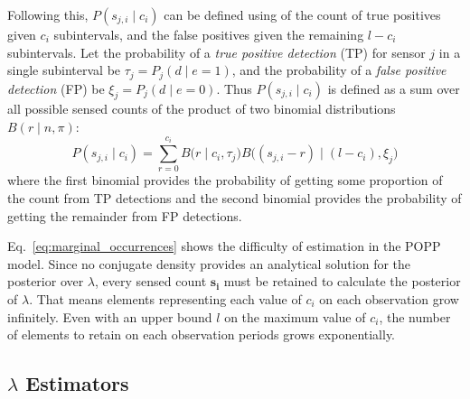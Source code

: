 Following this, $P(s_{j,i} \mid c_i)$ can be defined using of the count of true  positives given $c_i$ subintervals, and the false positives given the remaining $l-c_i$ subintervals. 
% 
Let the probability of a \textit{true positive detection} (TP) for sensor $j$ in a single subinterval be $\tau_j=P_j(d \mid e{=}1)$, and the probability of a \textit{false positive detection} (FP) be $\xi_j = P_j(d \mid e{=}0)$. Thus $P(s_{j,i} \mid c_i)$ is defined as a sum over all possible sensed counts of the product of two binomial distributions $B(r \mid n,\pi)$: 
\begin{equation}
	\label{eq:joint_binomial_distribution}
	P(s_{j,i} \mid c_i) \! = \! \! \! \displaystyle\sum_{r = 0}^{c_{i}} \! \! B\Big(r \mid c_i, \tau_j\Big) B\Big((s_{j,i} - r) \mid (l - c_{i}), \xi_j \Big)
\end{equation}
\noindent where the first binomial provides the probability of getting some proportion of the count from  TP detections and the second binomial provides the probability of getting the remainder from FP detections. 


Eq.~\ref{eq:marginal_occurrences} shows the difficulty of estimation in the POPP model. Since no conjugate density provides an analytical solution for the posterior over $\lambda$, every sensed count $\mathbf{s_i}$ must be retained to calculate the posterior of $\lambda$. That means elements representing each value of $c_i$ on each observation grow infinitely. Even with an upper bound $l$ on the maximum value of $c_i$, the number of elements to retain on each observation periods grows exponentially.

% 
\subsection*{$\lambda$ Estimators}\label{sec:estimators}

